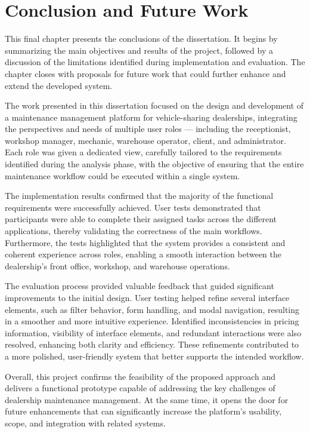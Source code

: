 \chapter{Conclusion and Future Work}%
\label{chapter:Conclusion and Future Work}

\begin{introduction}
This final chapter presents the conclusions of the dissertation. It begins by summarizing the main objectives and results of the project, followed by a discussion of the limitations identified during implementation and evaluation. The chapter closes with proposals for future work that could further enhance and extend the developed system.
\end{introduction} 

The work presented in this dissertation focused on the design and development of a maintenance management platform for vehicle-sharing dealerships, integrating the perspectives and needs of multiple user roles — including the receptionist, workshop manager, mechanic, warehouse operator, client, and administrator. Each role was given a dedicated view, carefully tailored to the requirements identified during the analysis phase, with the objective of ensuring that the entire maintenance workflow could be executed within a single system.

The implementation results confirmed that the majority of the functional requirements were successfully achieved. User tests demonstrated that participants were able to complete their assigned tasks across the different applications, thereby validating the correctness of the main workflows. Furthermore, the tests highlighted that the system provides a consistent and coherent experience across roles, enabling a smooth interaction between the dealership's front office, workshop, and warehouse operations.

The evaluation process provided valuable feedback that guided significant improvements to the initial design. User testing helped refine several interface elements, such as filter behavior, form handling, and modal navigation, resulting in a smoother and more intuitive experience. Identified inconsistencies in pricing information, visibility of interface elements, and redundant interactions were also resolved, enhancing both clarity and efficiency. These refinements contributed to a more polished, user-friendly system that better supports the intended workflow.

Overall, this project confirms the feasibility of the proposed approach and delivers a functional prototype capable of addressing the key challenges of dealership maintenance management. At the same time, it opens the door for future enhancements that can significantly increase the platform's usability, scope, and integration with related systems.

